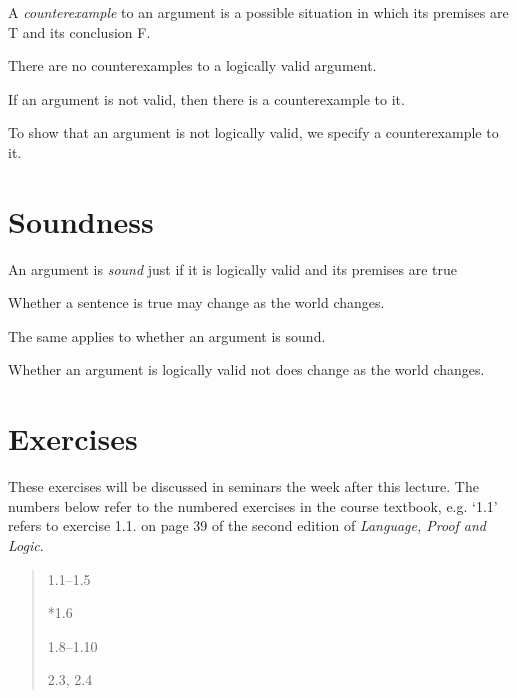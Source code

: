 \documentclass[12pt]{extarticle}
\begin{document}
\begin{multicols*}{3}
A \emph{counterexample} to an argument is a possible situation in which its premises are T and its conclusion F.
 
There are no counterexamples to a logically valid argument.
 
If an argument is not valid, then there is a counterexample to it.
 
To show that an argument is not logically valid, we specify a counterexample to it.
 
 
 
\section{Soundness}
 
An argument is \emph{sound} just if it is logically valid and its premises are true
 
Whether a sentence is true may change as the world changes.
 
The same applies to whether an argument is sound.
 
Whether an argument is logically valid not does change as the world changes.

\vfill

\begin{minipage}{\columnwidth}
\section{Exercises}
These exercises will be discussed in seminars the week after this lecture.
The numbers below refer to the numbered exercises in the course textbook, e.g. `1.1' refers to exercise 1.1. on page 39 of the second edition of \emph{Language, Proof and Logic}.
 
\begin{quote}
1.1--1.5
 
*1.6
 
1.8--1.10
 
2.3, 2.4
 
\end{quote}
\end{minipage}
 

 
\footnotesize 


\end{multicols*}
\end{document}
